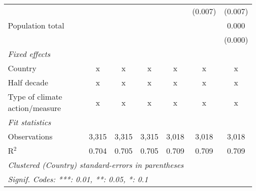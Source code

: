 \begin{tabular}{lcccccc}
                                                             &         &               &               &               & (0.007)       & (0.007)\\   
   Population total                                          &         &               &               &               &               & 0.000\\   
                                                             &         &               &               &               &               & (0.000)\\   
   \emph{Fixed effects}\\
   Country                                                   & x       & x             & x             & x             & x             & x\\  
   Half decade                                               & x       & x             & x             & x             & x             & x\\  
   Type of climate action/measure                            & x       & x             & x             & x             & x             & x\\  
   \midrule \emph{Fit statistics}\\
   Observations                                              & 3,315   & 3,315         & 3,315         & 3,018         & 3,018         & 3,018\\  
   R$^2$                                                     & 0.704   & 0.705         & 0.705         & 0.709         & 0.709         & 0.709\\  
   \midrule
   \multicolumn{7}{l}{\emph{Clustered (Country) standard-errors in parentheses}}\\
   \multicolumn{7}{l}{\emph{Signif. Codes: ***: 0.01, **: 0.05, *: 0.1}}\\
\end{tabular}
\par\endgroup


